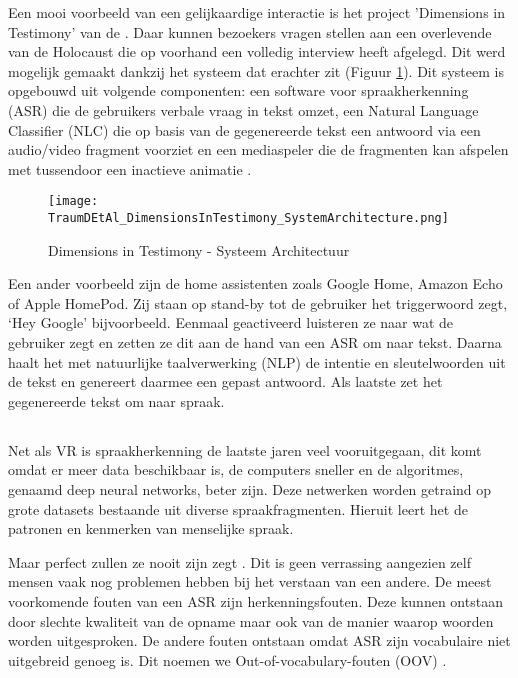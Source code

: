 Een mooi voorbeeld van een gelijkaardige interactie is het project 'Dimensions in Testimony' van de \textcite{USCShoahFoundation2020}. Daar kunnen bezoekers vragen stellen aan een overlevende van de Holocaust die op voorhand een volledig interview heeft afgelegd. Dit werd mogelijk gemaakt dankzij het systeem dat erachter zit (Figuur \ref{fig:DiTArchitecture}). Dit systeem is opgebouwd uit volgende componenten: een software voor spraakherkenning (ASR) die de gebruikers verbale vraag in tekst omzet, een Natural Language Classifier (NLC) die op basis van de gegenereerde tekst een antwoord via een audio/video fragment voorziet en een mediaspeler die de fragmenten kan afspelen met tussendoor een inactieve animatie \autocite{Traum2015}.

\begin{figure}[h]
    \centering
    \texttt{[image: TraumDEtAl\_DimensionsInTestimony\_SystemArchitecture.png]}
    \caption{Dimensions in Testimony - Systeem Architectuur \autocite{Traum2015}}
    \label{fig:DiTArchitecture}
\end{figure}

Een ander voorbeeld zijn de home assistenten zoals Google Home, Amazon Echo of Apple HomePod. Zij staan op stand-by tot de gebruiker het triggerwoord zegt, `Hey Google' bijvoorbeeld. Eenmaal geactiveerd luisteren ze naar wat de gebruiker zegt en zetten ze dit aan de hand van een ASR om naar tekst. Daarna haalt het met natuurlijke taalverwerking (NLP) de intentie en sleutelwoorden uit de tekst en genereert daarmee een gepast antwoord. Als laatste zet het gegenereerde tekst om naar spraak.

\subsection{}%

Net als VR is spraakherkenning de laatste jaren veel vooruitgegaan, dit komt omdat er meer data beschikbaar is, de computers sneller en de algoritmes, genaamd deep neural networks, beter zijn. Deze netwerken worden getraind op grote datasets bestaande uit diverse spraakfragmenten. Hieruit leert het de patronen en kenmerken van menselijke spraak.

Maar perfect zullen ze nooit zijn zegt \textcite{Hessen2020}. Dit is geen verrassing aangezien zelf mensen vaak nog problemen hebben bij het verstaan van een andere. De meest voorkomende fouten van een ASR zijn herkenningsfouten. Deze kunnen ontstaan door slechte kwaliteit van de opname maar ook van de manier waarop woorden worden uitgesproken. De andere fouten ontstaan omdat ASR zijn vocabulaire niet uitgebreid genoeg is. Dit noemen we Out-of-vocabulary-fouten (OOV) \autocite{Hessen2020}.

